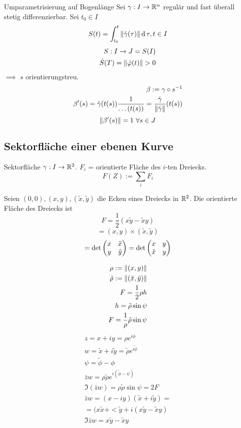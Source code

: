 \begin{Def}{Umparametrisierung auf Bogenlänge}
  Sei $\gamma:I\to\mathbb{R}^n$ regulär und fast überall stetig differenzierbar. Sei $t_0\in I$
  \[S(t)=\int^t_{t_0}\left\| \dot\gamma(\tau) \right\|\operatorname{d} \tau, t\in I\]
  \begin{align*}
    S:I\to J=S(I)\\
    \dot S(T)=\Norm{\dot\varphi(t)}>0
  \end{align*}
  $\implies$ $s$ orientierungstreu.
  \begin{align*}
    \beta:=\gamma\circ s^{-1}\\
    \beta'(s)=\dot\gamma(t(s))\frac{1}{\dots(t(s))}=\frac{\dot\gamma}{\left\| \dot\gamma \right\|}(t(s))
  \end{align*}
  \[\Norm{\beta'(s)}=1\ \forall s\in J\]
\end{Def}
\subsection{Sektorfläche einer ebenen Kurve}
\begin{Def}{Sektorfläche}
  $\gamma:I\to\mathbb{R}^2$. $F_i$ = orientierte Fläche des $i$-ten Dreiecks.
  \[F(Z):=\sum_iF_i\]
\end{Def}
\begin{Lem}
  Seien $(0,0),(x,y),(\tilde x,\tilde y)$ die Ecken eines Dreiecks in $\mathbb{R}^2$. Die orientierte Fläche des Dreiecks ist
  \[F=\frac{1}{2}\left( x\tilde y-\tilde x y \right)\]
  \[=(x,y)\times(\tilde x, \tilde y)\]
  \[=\det\begin{pmatrix}x&\tilde x\\y&\tilde y\end{pmatrix}=\det\begin{pmatrix}x&y\\ \tilde x&y\end{pmatrix}\]
\end{Lem}
\begin{Bew}
  \begin{align*}
    \rho:=\left\| (x,y) \right\|\\
    \tilde\rho:=\left\| (\tilde x, \tilde y) \right\|\\
    F=\frac{1}{2}\rho h\\
    h=\tilde\rho\sin\psi\\
    F=\frac{1}\rho\tilde\rho\sin\psi
  \end{align*}
  \begin{align*}
    z=x+iy=\rho e^{i\phi}\\
    w=\tilde x+i\tilde y=\tilde\rho e^{i\tilde\phi}\\
    \psi=\tilde\phi-\phi\\
    \bar z w=\rho\tilde\rho e^{i(\tilde\phi-\psi)}\\
    \Im(\bar z w)=\rho\tilde\rho\sin\psi=2F\\
    \bar z w=(x-iy)(\tilde x+i \tilde y)=\\
    =(x\tilde{x}+<\tilde{y}+i(x\tilde{y}-\tilde{x}y)\\
    \Im \bar z w=x\tilde{y}-\tilde{x}y
  \end{align*}
\end{Bew}
